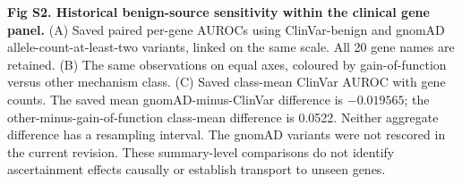 \caption{{\bf Fig S2. Historical benign-source sensitivity within the clinical gene panel.} (A) Saved paired per-gene AUROCs using ClinVar-benign and gnomAD allele-count-at-least-two variants, linked on the same scale. All 20 gene names are retained. (B) The same observations on equal axes, coloured by gain-of-function versus other mechanism class. (C) Saved class-mean ClinVar AUROC with gene counts. The saved mean gnomAD-minus-ClinVar difference is $-0.019565$; the other-minus-gain-of-function class-mean difference is 0.0522. Neither aggregate difference has a resampling interval. The gnomAD variants were not rescored in the current revision. These summary-level comparisons do not identify ascertainment effects causally or establish transport to unseen genes.}
